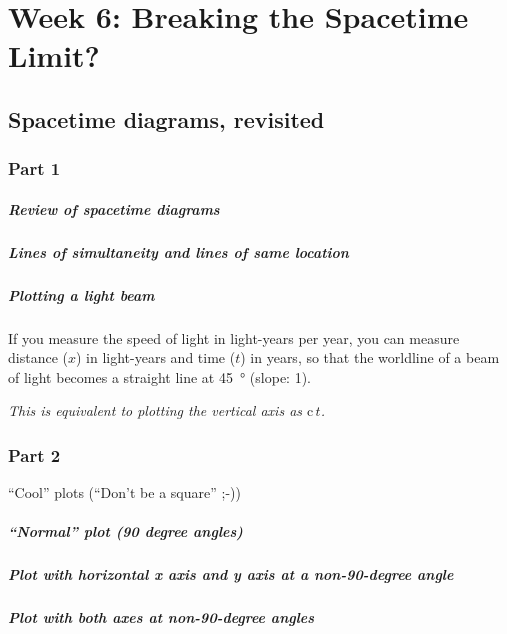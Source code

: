 \documentclass[pagesize,headsepline,10pt,parskip=half]{scrreprt}
\newcommand{\const}[1]{\ensuremath{\mathrm{#1}}}
\renewcommand{\c}{\const{c}}
\begin{document}
  \chapter{Week 6: Breaking the Spacetime Limit?}
    \section{Spacetime diagrams, revisited}
      \subsection{Part 1}
        \paragraph{Review of spacetime diagrams}
        \paragraph{Lines of simultaneity and lines of same location}
        \paragraph{Plotting a light beam}
          If you measure the speed of light in light-years per year,
          you can measure distance ($x$) in light-years and time ($t$) in years,
          so that the worldline of a beam of light becomes a straight
          line at \SI{45}{\degree} (slope: 1).

          \emph{This is equivalent to plotting the vertical axis as $\c{}\,t$.}

      \subsection{Part 2}
        ``Cool'' plots (``Don't be a square'' ;-))
        \paragraph{“Normal” plot (90 degree angles)}
        \paragraph{Plot with horizontal x axis and y axis at a non-90-degree angle}
        \paragraph{Plot with both axes at non-90-degree angles}
\end{document}
